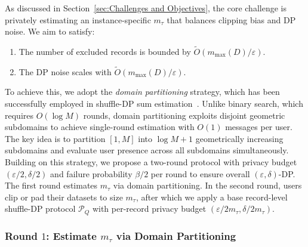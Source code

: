 As discussed in Section~\ref{sec:Challenges and Objectives}, the core challenge is privately estimating an instance-specific $m_\tau$ that balances clipping bias and DP noise. We aim to satisfy:
\begin{enumerate}
    \item[(a)] The number of excluded records is bounded by $\tilde{O}(m_{\max}(D)/\varepsilon)$.
    \item[(b)] The DP noise scales with $\tilde{O}(m_{\max}(D)/\varepsilon)$.
\end{enumerate}
To achieve this, we adopt the \textit{domain partitioning} strategy, which has been successfully employed in shuffle-DP sum estimation~\cite{dong2024almost}.
Unlike binary search, which requires $O(\log M)$ rounds, domain partitioning exploits disjoint geometric subdomains to achieve single-round estimation with $O(1)$ messages per user.
The key idea is to partition $[1, M]$ into $\log M + 1$ geometrically increasing subdomains and evaluate user presence across all subdomains simultaneously.
Building on this strategy, we propose a two-round protocol with privacy budget $(\varepsilon/2, \delta/2)$ and failure probability $\beta/2$ per round to ensure overall $(\varepsilon,\delta)$-DP. 
The first round estimates $m_\tau$ via domain partitioning.
In the second round, users clip or pad their datasets to size $m_\tau$, after which we apply a base record-level shuffle-DP protocol $\mathcal{P}_Q$ with per-record privacy budget $(\varepsilon/2m_\tau, \delta/2m_\tau)$.



\subsubsection{Round $1$: Estimate $m_\tau$ via Domain Partitioning}
\label{sec: static round 1}
\begin{algorithm}[t]
\caption{Randomizer for Estimating $m_\tau$} 
\label{alg:Randomizer for Estimating tau}
\end{algorithm}

